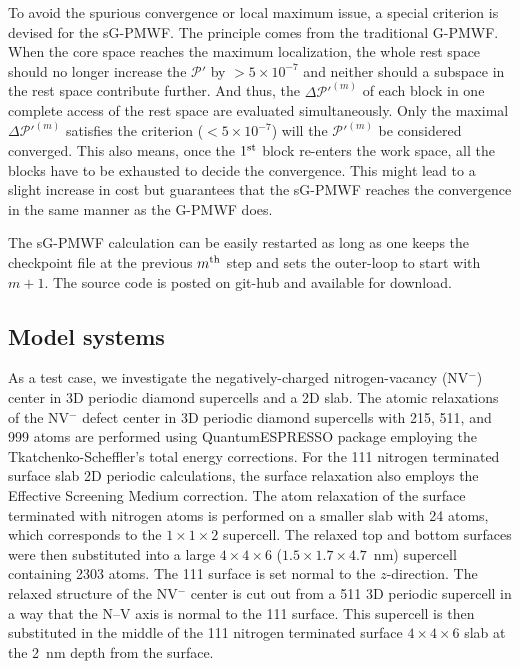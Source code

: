 \documentclass[journal=jacsat,manuscript=article]{achemso}
\begin{document}
To avoid the spurious convergence or local maximum issue, a special criterion is devised for the sG-PMWF. The principle comes from the traditional G-PMWF. When the core space reaches the maximum localization, the whole rest space should no longer increase the $\mathcal{P}'$ by $>5\times 10^{-7}$ and neither should a subspace in the rest space contribute further. And thus, the $\Delta \mathcal{P}'^{(m)}$ of each block in one complete access of the rest space are evaluated simultaneously. Only the maximal $\Delta \mathcal{P}'^{(m)}$ satisfies the criterion ($<5\times 10^{-7}$) will the $\mathcal{P}'^{(m)}$ be considered converged. This also means, once the $1^{\rm st}$ block re-enters the work space, all the blocks have to be exhausted to decide the convergence. This might lead to a slight increase in cost but guarantees that the sG-PMWF reaches the convergence in the same manner as the G-PMWF does.

The sG-PMWF calculation can be easily restarted as long as one keeps the checkpoint file at the previous $m^{\rm th}$ step and sets the outer-loop to start with $m+1$. The source code is posted on git-hub and available for download.

\subsection{Model systems}
As a test case, we investigate the negatively-charged nitrogen-vacancy (NV$^-$) center in 3D periodic diamond supercells and a 2D slab. The atomic relaxations of the NV$^-$ defect center in 3D periodic diamond supercells with 215, 511, and 999 atoms are performed using QuantumESPRESSO package\cite{QE2017} employing the Tkatchenko-Scheffler's total energy corrections\cite{TS_2009}. For the 111 nitrogen terminated surface slab 2D periodic calculations, the surface relaxation also employs the Effective Screening Medium correction\cite{Otani_2006}. The atom relaxation of the surface terminated with nitrogen atoms is performed on a smaller slab with 24 atoms, which corresponds to the $1\times1\times2$ supercell. The relaxed top and bottom surfaces were then substituted into a large $4\times4\times6$ ($1.5\times1.7\times4.7$~nm) supercell containing 2303 atoms. The 111 surface is set normal to the $z$-direction. The relaxed structure of the NV$^-$ center is cut out from a 511 3D periodic supercell in a way that the N--V axis is normal to the 111 surface. This supercell is then substituted in the middle of the 111 nitrogen terminated surface $4\times4\times6$ slab at the 2~nm depth from the surface. 
\end{document}
